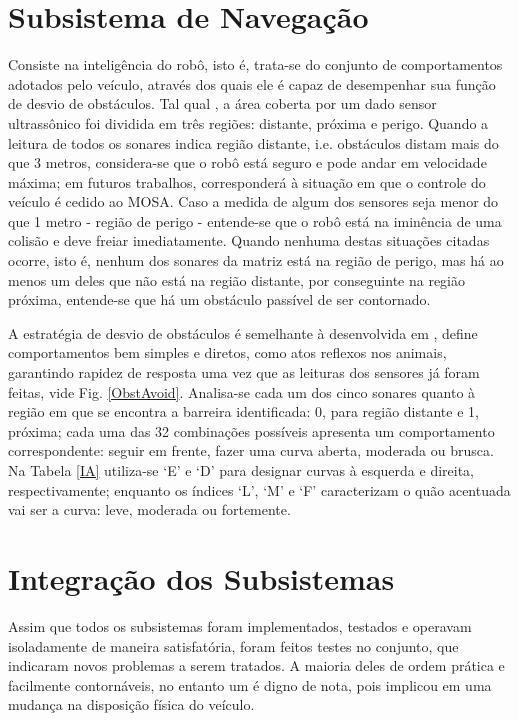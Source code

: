\section{Subsistema de Navegação} %
Consiste na inteligência  do robô, isto é, trata-se do conjunto de comportamentos adotados pelo veículo, através dos quais ele é capaz de 
desempenhar sua função de desvio de obstáculos. %
Tal qual \cite{Artigo_3}, a área coberta por um dado sensor ultrassônico foi dividida em três regiões: distante, próxima e perigo.
Quando a leitura de todos os sonares indica região distante, i.e. obstáculos distam mais do que 3 metros, considera-se que o robô 
está seguro e pode andar em velocidade máxima; em futuros trabalhos, corresponderá à situação em que o controle do veículo é cedido ao MOSA.
Caso a medida de algum dos sensores seja menor do que 1 metro - região de perigo - entende-se que o robô está na iminência de uma colisão e deve 
freiar imediatamente.
Quando nenhuma destas situações citadas ocorre, isto é, nenhum dos sonares da matriz está na região de perigo, mas há ao menos um deles que não está 
na região distante, por conseguinte na região próxima, entende-se que há um obstáculo passível de ser contornado.

A estratégia de desvio de obstáculos é semelhante à desenvolvida em \cite{Artigo_1}, define comportamentos bem simples e diretos, como atos reflexos 
nos animais, garantindo rapidez de resposta uma vez que as leituras dos sensores já foram feitas, vide Fig. \ref{ObstAvoid}.
Analisa-se cada um dos cinco sonares quanto à região em que se encontra a barreira identificada: 0, para região distante e 1, próxima;
cada uma das 32 combinações possíveis apresenta um comportamento correspondente: seguir em frente, fazer uma curva aberta, moderada ou brusca.
Na Tabela \ref{IA} utiliza-se \textquoteleft E\textquoteright{} e  \textquoteleft D\textquoteright{} para designar curvas à esquerda e direita, 
respectivamente; enquanto os índices \textquoteleft L\textquoteright{},  \textquoteleft M\textquoteright{} e \textquoteleft F\textquoteright{} 
caracterizam o quão acentuada vai ser a curva: leve, moderada ou fortemente. %

\section{Integração dos Subsistemas}
Assim que todos os subsistemas foram implementados, testados e operavam isoladamente de maneira satisfatória, foram feitos testes no conjunto, que 
indicaram novos problemas a serem tratados. 
A maioria deles de ordem prática e facilmente contornáveis, no entanto um é digno de nota, pois implicou em uma mudança na disposição física do 
veículo.

